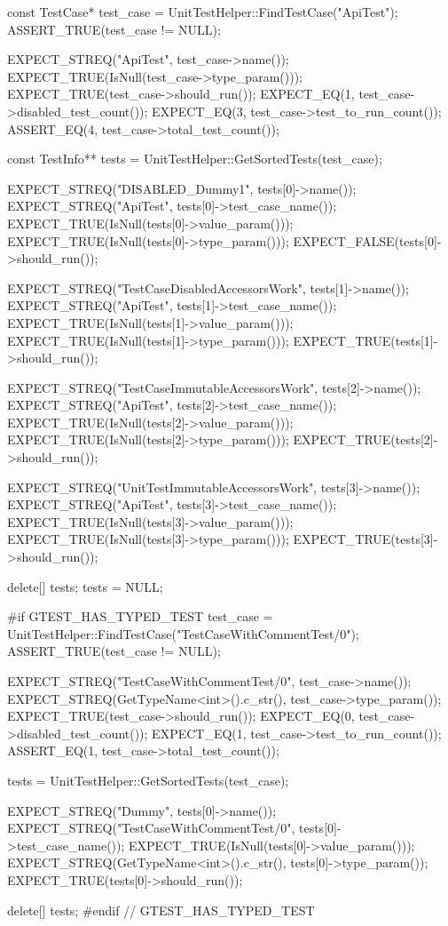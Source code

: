 \begin{DoxyCode}
                                              {
  const TestCase* test_case = UnitTestHelper::FindTestCase("ApiTest");
  ASSERT_TRUE(test_case != NULL);

  EXPECT_STREQ("ApiTest", test_case->name());
  EXPECT_TRUE(IsNull(test_case->type_param()));
  EXPECT_TRUE(test_case->should_run());
  EXPECT_EQ(1, test_case->disabled_test_count());
  EXPECT_EQ(3, test_case->test_to_run_count());
  ASSERT_EQ(4, test_case->total_test_count());

  const TestInfo** tests = UnitTestHelper::GetSortedTests(test_case);

  EXPECT_STREQ("DISABLED_Dummy1", tests[0]->name());
  EXPECT_STREQ("ApiTest", tests[0]->test_case_name());
  EXPECT_TRUE(IsNull(tests[0]->value_param()));
  EXPECT_TRUE(IsNull(tests[0]->type_param()));
  EXPECT_FALSE(tests[0]->should_run());

  EXPECT_STREQ("TestCaseDisabledAccessorsWork", tests[1]->name());
  EXPECT_STREQ("ApiTest", tests[1]->test_case_name());
  EXPECT_TRUE(IsNull(tests[1]->value_param()));
  EXPECT_TRUE(IsNull(tests[1]->type_param()));
  EXPECT_TRUE(tests[1]->should_run());

  EXPECT_STREQ("TestCaseImmutableAccessorsWork", tests[2]->name());
  EXPECT_STREQ("ApiTest", tests[2]->test_case_name());
  EXPECT_TRUE(IsNull(tests[2]->value_param()));
  EXPECT_TRUE(IsNull(tests[2]->type_param()));
  EXPECT_TRUE(tests[2]->should_run());

  EXPECT_STREQ("UnitTestImmutableAccessorsWork", tests[3]->name());
  EXPECT_STREQ("ApiTest", tests[3]->test_case_name());
  EXPECT_TRUE(IsNull(tests[3]->value_param()));
  EXPECT_TRUE(IsNull(tests[3]->type_param()));
  EXPECT_TRUE(tests[3]->should_run());

  delete[] tests;
  tests = NULL;

#if GTEST_HAS_TYPED_TEST
  test_case = UnitTestHelper::FindTestCase("TestCaseWithCommentTest/0");
  ASSERT_TRUE(test_case != NULL);

  EXPECT_STREQ("TestCaseWithCommentTest/0", test_case->name());
  EXPECT_STREQ(GetTypeName<int>().c_str(), test_case->type_param());
  EXPECT_TRUE(test_case->should_run());
  EXPECT_EQ(0, test_case->disabled_test_count());
  EXPECT_EQ(1, test_case->test_to_run_count());
  ASSERT_EQ(1, test_case->total_test_count());

  tests = UnitTestHelper::GetSortedTests(test_case);

  EXPECT_STREQ("Dummy", tests[0]->name());
  EXPECT_STREQ("TestCaseWithCommentTest/0", tests[0]->test_case_name());
  EXPECT_TRUE(IsNull(tests[0]->value_param()));
  EXPECT_STREQ(GetTypeName<int>().c_str(), tests[0]->type_param());
  EXPECT_TRUE(tests[0]->should_run());

  delete[] tests;
#endif  // GTEST_HAS_TYPED_TEST
}
\end{DoxyCode}
